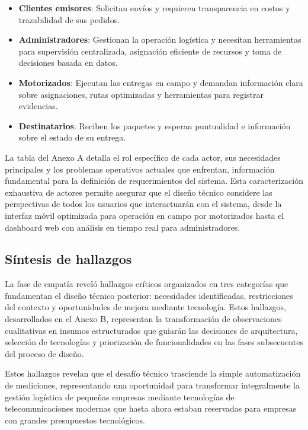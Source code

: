 \begin{itemize}
    \item \textbf{Clientes emisores}: Solicitan envíos y requieren transparencia en costos y trazabilidad de sus pedidos.
    
    \item \textbf{Administradores}: Gestionan la operación logística y necesitan herramientas para supervisión centralizada, asignación eficiente de recursos y toma de decisiones basada en datos.
    
    \item \textbf{Motorizados}: Ejecutan las entregas en campo y demandan información clara sobre asignaciones, rutas optimizadas y herramientas para registrar evidencias.
    
    \item \textbf{Destinatarios}: Reciben los paquetes y esperan puntualidad e información sobre el estado de su entrega.
\end{itemize}

La tabla del Anexo A detalla el rol específico de cada actor, sus necesidades principales y los problemas operativos actuales que enfrentan, información fundamental para la definición de requerimientos del sistema. Esta caracterización exhaustiva de actores permite asegurar que el diseño técnico considere las perspectivas de todos los usuarios que interactuarán con el sistema, desde la interfaz móvil optimizada para operación en campo por motorizados hasta el dashboard web con análisis en tiempo real para administradores.

\subsection{Síntesis de hallazgos}

La fase de empatía reveló hallazgos críticos organizados en tres categorías que fundamentan el diseño técnico posterior: necesidades identificadas, restricciones del contexto y oportunidades de mejora mediante tecnología. Estos hallazgos, desarrollados en el Anexo B, representan la transformación de observaciones cualitativas en insumos estructurados que guiarán las decisiones de arquitectura, selección de tecnologías y priorización de funcionalidades en las fases subsecuentes del proceso de diseño.

Estos hallazgos revelan que el desafío técnico trasciende la simple automatización de mediciones, representando una oportunidad para transformar integralmente la gestión logística de pequeñas empresas mediante tecnologías de telecomunicaciones modernas que hasta ahora estaban reservadas para empresas con grandes presupuestos tecnológicos.

